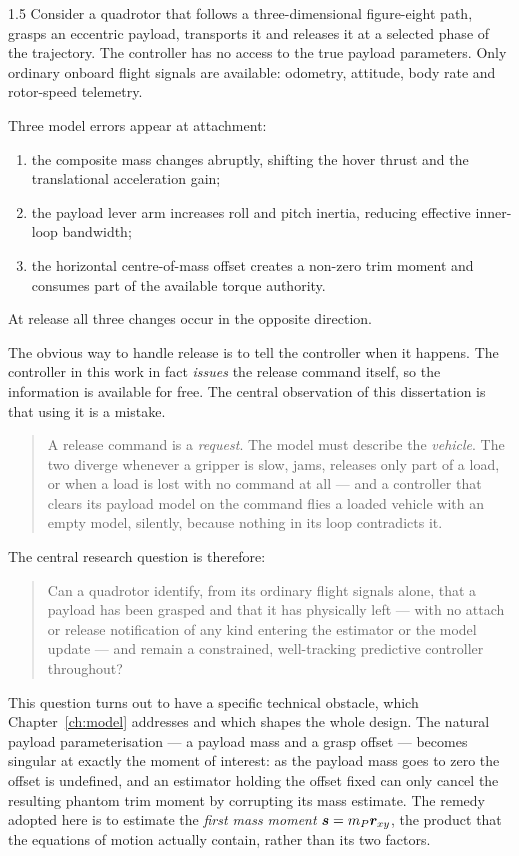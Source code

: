 \begin{spacing}{1.5}
Consider a quadrotor that follows a three-dimensional figure-eight path, grasps
an eccentric payload, transports it and releases it at a selected phase of the
trajectory. The controller has no access to the true payload parameters. Only
ordinary onboard flight signals are available: odometry, attitude, body rate and
rotor-speed telemetry.

Three model errors appear at attachment:
\begin{enumerate}
\item the composite mass changes abruptly, shifting the hover thrust and the
translational acceleration gain;
\item the payload lever arm increases roll and pitch inertia, reducing effective
inner-loop bandwidth;
\item the horizontal centre-of-mass offset creates a non-zero trim moment and
consumes part of the available torque authority.
\end{enumerate}
At release all three changes occur in the opposite direction.

The obvious way to handle release is to tell the controller when it happens. The
controller in this work in fact \emph{issues} the release command itself, so the
information is available for free. The central observation of this dissertation
is that using it is a mistake.

\begin{quote}
A release command is a \emph{request}. The model must describe the
\emph{vehicle}. The two diverge whenever a gripper is slow, jams, releases only
part of a load, or when a load is lost with no command at all --- and a
controller that clears its payload model on the command flies a loaded vehicle
with an empty model, silently, because nothing in its loop contradicts it.
\end{quote}

The central research question is therefore:

\begin{quote}
Can a quadrotor identify, from its ordinary flight signals alone, that a payload
has been grasped and that it has physically left --- with no attach or release
notification of any kind entering the estimator or the model update --- and
remain a constrained, well-tracking predictive controller throughout?
\end{quote}

This question turns out to have a specific technical obstacle, which
Chapter~\ref{ch:model} addresses and which shapes the whole design. The natural
payload parameterisation --- a payload mass and a grasp offset --- becomes
singular at exactly the moment of interest: as the payload mass goes to zero the
offset is undefined, and an estimator holding the offset fixed can only cancel
the resulting phantom trim moment by corrupting its mass estimate. The remedy
adopted here is to estimate the \emph{first mass moment} $\bm{s}=m_P\bm r_{xy}$,
the product that the equations of motion actually contain, rather than its two
factors.


\end{spacing}
